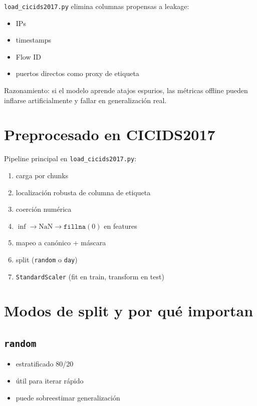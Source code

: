 ﻿\documentclass[12pt,a4paper]{article}
\begin{document}
\verb|load_cicids2017.py| elimina columnas propensas a leakage:

\begin{itemize}
  \item IPs
  \item timestamps
  \item Flow ID
  \item puertos directos como proxy de etiqueta
\end{itemize}

Razonamiento: si el modelo aprende atajos espurios, las métricas offline pueden inflarse
artificialmente y fallar en generalización real.

\section{Preprocesado en CICIDS2017}

Pipeline principal en \verb|load_cicids2017.py|:

\begin{enumerate}
  \item carga por chunks
  \item localización robusta de columna de etiqueta
  \item coerción numérica
  \item \(\inf \to \text{NaN} \to \texttt{fillna}(0)\) en features
  \item mapeo a canónico + máscara
  \item split (\texttt{random} o \texttt{day})
  \item \texttt{StandardScaler} (fit en train, transform en test)
\end{enumerate}

\section{Modos de split y por qué importan}

\subsection{\texttt{random}}

\begin{itemize}
  \item estratificado 80/20
  \item útil para iterar rápido
  \item puede sobreestimar generalización
\end{itemize}
\end{document}
